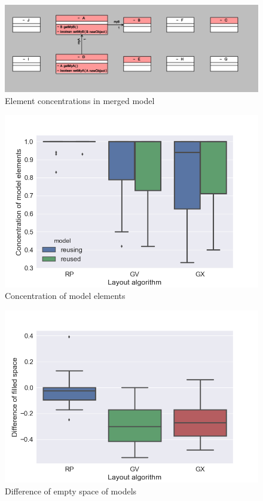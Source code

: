 \begin{figure}
\includegraphics[width=\linewidth]{Evaluation/linksample.png}
	\caption{Element concentrations in merged model}
	\label{fig : links sample}
\end{figure}

\begin{figure}
\includegraphics[width=0.9\linewidth]{Evaluation/linkedcomponent.png}
	\caption{Concentration of model elements}
	\label{fig : linked components}
\end{figure}

\begin{figure}
\includegraphics[width=0.9\linewidth]{Evaluation/filledspace.png}
	\caption{Difference of empty space of models}
	\label{fig :Empty Space}
\end{figure}

